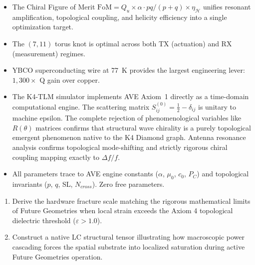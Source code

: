 \begin{summarybox}
\begin{itemize}
    \item The Chiral Figure of Merit $\text{FoM} = Q_u \times \alpha \cdot pq/(p+q) \times \eta_{\mathcal{H}}$ unifies resonant amplification, topological coupling, and helicity efficiency into a single optimization target.
    \item The $(7,11)$ torus knot is optimal across both TX (actuation) and RX (measurement) regimes.
    \item YBCO superconducting wire at 77~K provides the largest engineering lever: $1{,}300\times$ Q gain over copper.
    \item The K4-TLM simulator implements AVE Axiom~1 directly as a time-domain computational engine. The scattering matrix $S^{(0)}_{ij} = \frac{1}{2} - \delta_{ij}$ is unitary to machine epsilon. The complete rejection of phenomenological variables like $R(\theta)$ matrices confirms that structural wave chirality is a purely topological emergent phenomenon native to the K4 Diamond graph. Antenna resonance analysis confirms topological mode-shifting and strictly rigorous chiral coupling mapping exactly to $\Delta f / f$.
    \item All parameters trace to AVE engine constants ($\alpha$, $\mu_0$, $c_0$, $P_C$) and topological invariants ($p$, $q$, SL, $N_{cross}$). Zero free parameters.
\end{itemize}
\end{summarybox}

\begin{exercisebox}
\begin{enumerate}
    \item Derive the hardware fracture scale matching the rigorous mathematical limits of Future Geometries when local strain exceeds the Axiom 4 topological dielectric threshold ($\varepsilon > 1.0$).
    \item Construct a native LC structural tensor illustrating how macroscopic power cascading forces the spatial substrate into localized saturation during active Future Geometries operation.
\end{enumerate}
\end{exercisebox}
